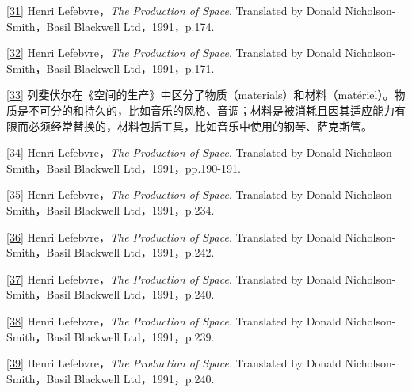 \documentclass[UTF8, fontset = sourcesans, a4paper, oneside, zihao =
-4, scheme=chinese, no-math, space=true]{ctexbook}
\begin{document}
\protect\hypertarget{part0006_split_003.htmlux5cux23m31}{}{}\protect\hyperlink{part0006_split_002.htmlux5cux23w31}{{[}31{]}}
Henri Lefebvre，\emph{The Production of Space}. Translated by Donald
Nicholson-Smith，Basil Blackwell Ltd，1991，p.174.

\protect\hypertarget{part0006_split_003.htmlux5cux23m32}{}{}\protect\hyperlink{part0006_split_002.htmlux5cux23w32}{{[}32{]}}
Henri Lefebvre，\emph{The Production of Space}. Translated by Donald
Nicholson-Smith，Basil Blackwell Ltd，1991，p.171.

\protect\hypertarget{part0006_split_003.htmlux5cux23m33}{}{}\protect\hyperlink{part0006_split_002.htmlux5cux23w33}{{[}33{]}}
列斐伏尔在《空间的生产》中区分了物质（materials）和材料（matériel）。物质是不可分的和持久的，比如音乐的风格、音调；材料是被消耗且因其适应能力有限而必须经常替换的，材料包括工具，比如音乐中使用的钢琴、萨克斯管。

\protect\hypertarget{part0006_split_003.htmlux5cux23m34}{}{}\protect\hyperlink{part0006_split_002.htmlux5cux23w34}{{[}34{]}}
Henri Lefebvre，\emph{The Production of Space}. Translated by Donald
Nicholson-Smith，Basil Blackwell Ltd，1991，pp.190-191.

\protect\hypertarget{part0006_split_003.htmlux5cux23m35}{}{}\protect\hyperlink{part0006_split_003.htmlux5cux23w35}{{[}35{]}}
Henri Lefebvre，\emph{The Production of Space}. Translated by Donald
Nicholson-Smith，Basil Blackwell Ltd，1991，p.234.

\protect\hypertarget{part0006_split_003.htmlux5cux23m36}{}{}\protect\hyperlink{part0006_split_003.htmlux5cux23w36}{{[}36{]}}
Henri Lefebvre，\emph{The Production of Space}. Translated by Donald
Nicholson-Smith，Basil Blackwell Ltd，1991，p.242.

\protect\hypertarget{part0006_split_003.htmlux5cux23m37}{}{}\protect\hyperlink{part0006_split_003.htmlux5cux23w37}{{[}37{]}}
Henri Lefebvre，\emph{The Production of Space}. Translated by Donald
Nicholson-Smith，Basil Blackwell Ltd，1991，p.240.

\protect\hypertarget{part0006_split_003.htmlux5cux23m38}{}{}\protect\hyperlink{part0006_split_003.htmlux5cux23w38}{{[}38{]}}
Henri Lefebvre，\emph{The Production of Space}. Translated by Donald
Nicholson-Smith，Basil Blackwell Ltd，1991，p.239.

\protect\hypertarget{part0006_split_003.htmlux5cux23m39}{}{}\protect\hyperlink{part0006_split_003.htmlux5cux23w39}{{[}39{]}}
Henri Lefebvre，\emph{The Production of Space}. Translated by Donald
Nicholson-Smith，Basil Blackwell Ltd，1991，p.240.
\end{document}
